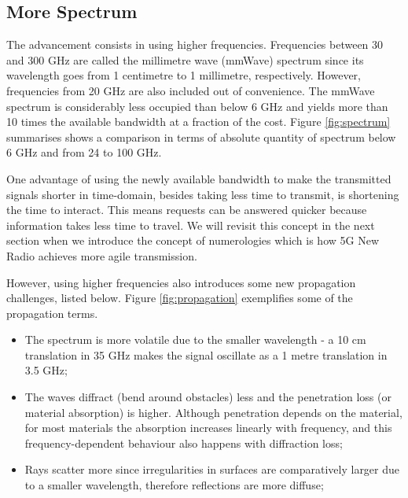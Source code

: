 \subsection*{More Spectrum}

The advancement consists in using higher frequencies. Frequencies between 30 and 300 GHz are called the millimetre wave (mmWave) spectrum since its wavelength goes from 1 centimetre to 1 millimetre, respectively. However, frequencies from 20 GHz are also included out of convenience. The mmWave spectrum is considerably less occupied than below 6 GHz and yields more than 10 times the available bandwidth at a fraction of the cost. Figure \ref{fig:spectrum} summarises shows a comparison in terms of absolute quantity of spectrum below 6 GHz and from 24 to 100 GHz.


One advantage of using the newly available bandwidth to make the transmitted signals shorter in time-domain, besides taking less time to transmit, is shortening the time to interact. This means requests can be answered quicker because information takes less time to travel. We will revisit this concept in the next section when we introduce the concept of numerologies which is how 5G New Radio achieves more agile transmission.

However, using higher frequencies also introduces some new propagation challenges, listed below. Figure \ref{fig:propagation} exemplifies some of the propagation terms.

\begin{itemize}
    \item The spectrum is more volatile due to the smaller wavelength - a 10 cm translation in 35 GHz makes the signal oscillate as a 1 metre translation in 3.5 GHz;
    \item The waves diffract (bend around obstacles) less and the penetration loss (or material absorption) is higher. Although penetration depends on the material, for most materials the absorption increases linearly with frequency, and this frequency-dependent behaviour also happens with diffraction loss;
    \item Rays scatter more since irregularities in surfaces are comparatively larger due to a smaller wavelength, therefore reflections are more diffuse;
\end{itemize}



